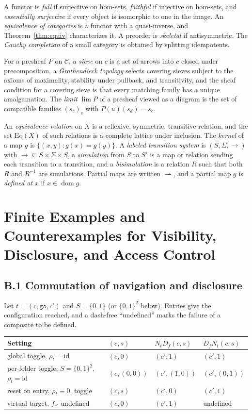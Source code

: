 \documentclass[11pt]{article}
\theoremstyle{definition}
\theoremstyle{remark}
\newcommand{\cC}{\mathcal C}
\newcommand{\id}{\mathrm{id}}
\newcommand{\dom}{\operatorname{dom}}
\newcommand{\pfn}{\rightharpoonup}
\begin{document}
A functor is \emph{full} if surjective on hom-sets, \emph{faithful} if injective on hom-sets, and \emph{essentially surjective} if every object is isomorphic to one in the image. An \emph{equivalence of categories} is a functor with a quasi-inverse, and Theorem~\ref{thm:equiv} characterizes it. A preorder is \emph{skeletal} if antisymmetric. The \emph{Cauchy completion} of a small category is obtained by splitting idempotents.

For a presheaf $P$ on $\cC$, a \emph{sieve} on $c$ is a set of arrows into $c$ closed under precomposition, a \emph{Grothendieck topology} selects covering sieves subject to the axioms of maximality, stability under pullback, and transitivity, and the sheaf condition for a covering sieve is that every matching family has a unique amalgamation. The \emph{limit} $\lim P$ of a presheaf viewed as a diagram is the set of compatible families $(s_c)_c$ with $P(u)(s_d)=s_c$.

An \emph{equivalence relation} on $X$ is a reflexive, symmetric, transitive relation, and the set $\mathrm{Eq}(X)$ of such relations is a complete lattice under inclusion. The \emph{kernel} of a map $g$ is $\{(x,y):g(x)=g(y)\}$. A \emph{labeled transition system} is $(S,\Sigma,\to)$ with $\to\subseteq S\times\Sigma\times S$, a \emph{simulation} from $S$ to $S'$ is a map or relation sending each transition to a transition, and a \emph{bisimulation} is a relation $R$ such that both $R$ and $R^{-1}$ are simulations. Partial maps are written $\pfn$, and a partial map $g$ is \emph{defined at} $x$ if $x\in\dom g$.

\section{Finite Examples and Counterexamples for Visibility, Disclosure, and Access Control}

\subsection*{B.1 Commutation of navigation and disclosure}

Let $t=(c,\texttt{go},c')$ and $S=\{0,1\}$ (or $\{0,1\}^2$ below). Entries give the configuration reached, and a dash-free ``undefined'' marks the failure of a composite to be defined.

\begin{center}
\begin{tabular}{llll}
\toprule
Setting & $(c,s)$ & $N_tD_f(c,s)$ & $D_fN_t(c,s)$\\
\midrule
global toggle, $\rho_t=\id$ & $(c,0)$ & $(c',1)$ & $(c',1)$\\
per-folder toggle, $S=\{0,1\}^2$, $\rho_t=\id$ & $(c,(0,0))$ & $(c',(1,0))$ & $(c',(0,1))$\\
reset on entry, $\rho_t\equiv0$, toggle & $(c,s)$ & $(c',0)$ & $(c',1)$\\
virtual target, $f_{c'}$ undefined & $(c,0)$ & $(c',1)$ & undefined\\
\bottomrule
\end{tabular}
\end{center}
\end{document}
